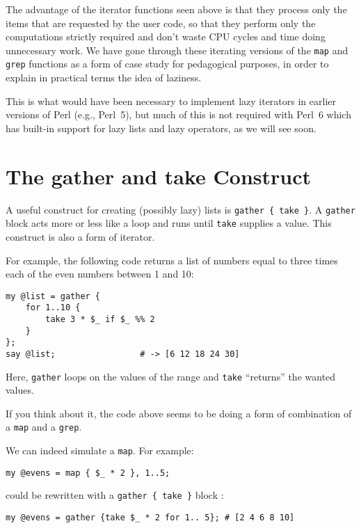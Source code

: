 The advantage of the iterator functions seen above is that they 
process only the items that are requested by the user code, so 
that they perform only the computations strictly required and 
don't waste CPU cycles and time doing unnecessary work. We have 
gone through these iterating versions of the {\tt map} 
and {\tt grep} functions as a form of case study for 
pedagogical purposes, in order to explain in practical terms 
the idea of laziness. 

This is what would have been necessary to implement lazy 
iterators in earlier versions of Perl (e.g., Perl~5), but 
much of this is not required with Perl~6 which has built-in 
support for lazy lists and lazy operators, as we will see soon.

\section{The gather and take Construct}

A useful construct for creating (possibly lazy) lists 
is  \verb'gather { take }'. A \verb'gather' block 
acts more or less like a loop and runs until 
\verb'take' supplies a value. This construct is also 
a form of iterator.

For example, the following code returns a list of 
numbers equal to three times each of the even numbers 
between 1 and 10:

\begin{verbatim}
my @list = gather { 
    for 1..10 {
        take 3 * $_ if $_ %% 2
    } 
};
say @list;                 # -> [6 12 18 24 30]
\end{verbatim}

Here, \verb'gather' loops on the values of the range 
and {\tt take} ``returns'' the wanted values.

If you think about it, the code above seems to 
be doing a form of combination of a {\tt map} and a 
{\tt grep}.

We can indeed simulate a \verb'map'. For example:

\begin{verbatim}
my @evens = map { $_ * 2 }, 1..5;
\end{verbatim}

could be rewritten with a \verb'gather { take }' 
block :

\begin{verbatim}
my @evens = gather {take $_ * 2 for 1.. 5}; # [2 4 6 8 10]
\end{verbatim}


